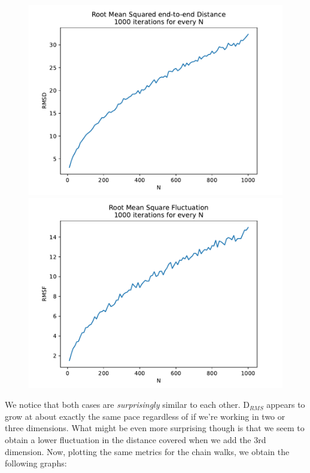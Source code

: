 \documentclass[a4paper,12pt]{article}
\begin{document}
\begin{figure}[!ht]
  \centering
  \begin{minipage}{0.49\textwidth}
    \includegraphics[width=\textwidth]{img/2-grid-2d-rmsd.pdf}
  \end{minipage}
  \begin{minipage}{0.49\textwidth}
    \includegraphics[width=\textwidth]{img/2-grid-2d-rmsf.pdf}
  \end{minipage}
\end{figure}

We notice that both cases are \emph{surprisingly} similar to each other. $\mathrm{D}_{RMS}$ appears to grow at
about exactly the same pace regardless of if we're working in two or three dimensions. What might be even more
surprising though is that we seem to obtain a lower fluctuation in the distance covered when we add the 3rd
dimension. Now, plotting the same metrics for the chain walks, we obtain the following graphs:
\end{document}
